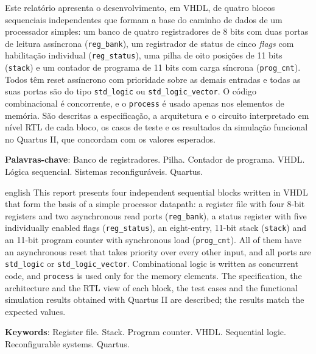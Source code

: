\begin{resumo}
Este relatório apresenta o desenvolvimento, em VHDL, de quatro blocos sequenciais independentes que formam a base do caminho de dados de um processador simples: um banco de quatro registradores de 8 bits com duas portas de leitura assíncrona (\texttt{reg\_bank}), um registrador de status de cinco \textit{flags} com habilitação individual (\texttt{reg\_status}), uma pilha de oito posições de 11 bits (\texttt{stack}) e um contador de programa de 11 bits com carga síncrona (\texttt{prog\_cnt}). Todos têm reset assíncrono com prioridade sobre as demais entradas e todas as suas portas são do tipo \texttt{std\_logic} ou \texttt{std\_logic\_vector}. O código combinacional é concorrente, e o \texttt{process} é usado apenas nos elementos de memória. São descritas a especificação, a arquitetura e o circuito interpretado em nível RTL de cada bloco, os casos de teste e os resultados da simulação funcional no Quartus II, que concordam com os valores esperados.

\textbf{Palavras-chave}: Banco de registradores. Pilha. Contador de programa. VHDL. Lógica sequencial. Sistemas reconfiguráveis. Quartus.
\end{resumo}

\begin{resumo}[Abstract]
\begin{otherlanguage*}{english}
This report presents four independent sequential blocks written in VHDL that form the basis of a simple processor datapath: a register file with four 8-bit registers and two asynchronous read ports (\texttt{reg\_bank}), a status register with five individually enabled flags (\texttt{reg\_status}), an eight-entry, 11-bit stack (\texttt{stack}) and an 11-bit program counter with synchronous load (\texttt{prog\_cnt}). All of them have an asynchronous reset that takes priority over every other input, and all ports are \texttt{std\_logic} or \texttt{std\_logic\_vector}. Combinational logic is written as concurrent code, and \texttt{process} is used only for the memory elements. The specification, the architecture and the RTL view of each block, the test cases and the functional simulation results obtained with Quartus II are described; the results match the expected values.

\vspace{\onelineskip}
\noindent\textbf{Keywords}: Register file. Stack. Program counter. VHDL. Sequential logic. Reconfigurable systems. Quartus.
\end{otherlanguage*}
\end{resumo}
